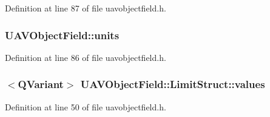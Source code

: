 Definition at line 87 of file uavobjectfield.\-h.

\hypertarget{group___u_a_v_objects_plugin_ga1ecf5fdaab2ac408b67623d5d75368c5}{
\subsubsection[{units}]{ U\-A\-V\-Object\-Field\-::units\hspace{0.3cm}{\ttfamily [protected]}}}\label{group___u_a_v_objects_plugin_ga1ecf5fdaab2ac408b67623d5d75368c5}


Definition at line 86 of file uavobjectfield.\-h.

\hypertarget{group___u_a_v_objects_plugin_ga27188ffa94eb6c560765dd56b0471561}{
\subsubsection[{values}]{$<$Q\-Variant$>$ U\-A\-V\-Object\-Field\-::\-Limit\-Struct\-::values}}\label{group___u_a_v_objects_plugin_ga27188ffa94eb6c560765dd56b0471561}


Definition at line 50 of file uavobjectfield.\-h.



